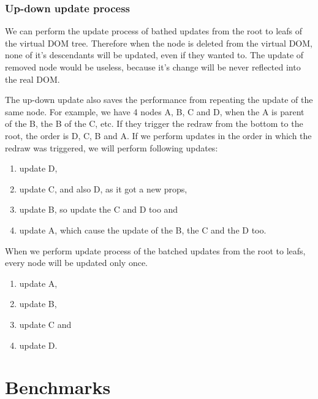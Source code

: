 \documentclass[oneside, 12pt]{book}
\begin{document}
    \subsection{Up-down update process}\label{sec:performance-optimizations-batched-updates}

      We can perform the update process of bathed updates from the root to leafs of the virtual DOM tree. 
      Therefore when the node is deleted from the virtual DOM, none of it's descendants will be updated, even if they wanted to.
      The update of removed node would be useless, because it's change will be never reflected into the real DOM. 

      The up-down update also saves the performance from repeating the update of the same node. 
      For example, we have 4 nodes A, B, C and D, when the A is parent of the B, the B of the C, etc. 
      If they trigger the redraw from the bottom to the root, the order is D, C, B and A. 
      If we perform updates in the order in which the redraw was triggered, we will perform following updates:

      \begin{enumerate}
            \item update D,
            \item update C, and also D, as it got a new props,
            \item update B, so update the C and D too and 
            \item update A, which cause the update of the B, the C and the D too. 
      \end{enumerate}

      When we perform update process of the batched updates from the root to leafs, every node will be updated only once. 

      \begin{enumerate}
            \item update A,
            \item update B,  
            \item update C and 
            \item update D.
      \end{enumerate}



\chapter{Benchmarks}\label{chap:benchmarks}
\end{document}

